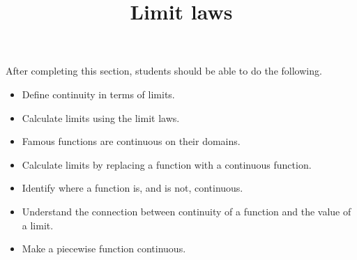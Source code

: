 \documentclass{ximera}
\title{Limit laws}
\begin{document}
\begin{abstract}
\end{abstract}

\maketitle

\begin{sectionOutcomes}
After completing this section, students should be able to do the following.

\begin{itemize}
\item Define continuity in terms of limits.
\item Calculate limits using the limit laws.
\item Famous functions are continuous on their domains. 
\item Calculate limits by replacing a function with a continuous
  function.
\item Identify where a function is, and is not, continuous.
\item Understand the connection between continuity of a function and
  the value of a limit.
\item Make a piecewise function continuous.
\end{itemize}
\end{sectionOutcomes}
\end{document}
